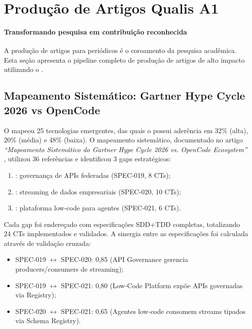 \section{Produção de Artigos Qualis A1}
\label{sec:producao-artigos-qualis}
\nivelphd

\paragraph{Transformando pesquisa em contribuição reconhecida} A produção de artigos para periódicos \qualisA{} é o coroamento da pesquisa
acadêmica. Esta seção apresenta o pipeline completo de produção de artigos
de alto impacto utilizando o \opencodeeco{} \cite{laranjeira2026gartner,
laranjeira2026cora, laranjeira2026opencode}.

\subsection{Mapeamento Sistemático: Gartner Hype Cycle 2026 vs OpenCode}

O  \cite{gartner2026hype}
mapeou 25 tecnologias emergentes, das quais o \opencodeeco{} possui aderência
em 32\% (alta), 20\% (média) e 48\% (baixa). O mapeamento sistemático,
documentado no artigo \textit{``Mapeamento Sistemático do Gartner Hype Cycle
2026 vs. OpenCode Ecosystem''} \cite{laranjeira2026gartner}, utilizou 36
referências e identificou 3 gaps estratégicos:

\begin{enumerate}
\item {}: governança de APIs
      federadas (SPEC-019, 8 CTs);
\item {}: streaming de dados
      empresariais (SPEC-020, 10 CTs);
\item {}: plataforma low-code para
      agentes (SPEC-021, 6 CTs).
\end{enumerate}

Cada gap foi endereçado com especificações SDD+TDD completas, totalizando
24 CTs implementados e validados. A sinergia entre as especificações foi
calculada através de validação cruzada:
\begin{itemize}
\item SPEC-019 $\leftrightarrow$ SPEC-020: 0,85 (API Governance gerencia
      producers/consumers de streaming);
\item SPEC-019 $\leftrightarrow$ SPEC-021: 0,80 (Low-Code Platform expõe APIs
      governadas via Registry);
\item SPEC-020 $\leftrightarrow$ SPEC-021: 0,65 (Agentes low-code consomem
      streams tipados via Schema Registry).
\end{itemize}

